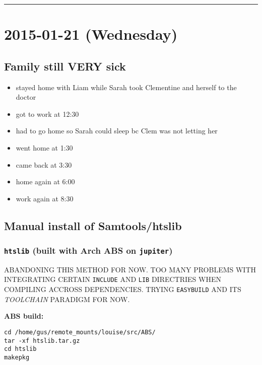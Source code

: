 \documentclass[letterpaper]{scrartcl}
\begin{document}
\begin{center}\rule{0.5\linewidth}{\linethickness}\end{center}

\section{2015-01-21 (Wednesday)}\label{wednesday-1}

\subsection{Family still VERY sick}\label{family-still-very-sick}

\begin{itemize}
\itemsep1pt\parskip0pt
\item
  stayed home with Liam while Sarah took Clementine and herself to the
  doctor
\item
  got to work at 12:30
\item
  had to go home so Sarah could sleep bc Clem was not letting her
\item
  went home at 1:30
\item
  came back at 3:30
\item
  home again at 6:00
\item
  work again at 8:30
\end{itemize}

\subsection{Manual install of
Samtools/htslib}\label{manual-install-of-samtoolshtslib}

\subsubsection{\texttt{htslib} (built with Arch ABS on
\texttt{jupiter})}\label{htslib-built-with-arch-abs-on-jupiter}

ABANDONING THIS METHOD FOR NOW. TOO MANY PROBLEMS WITH INTEGRATING
CERTAIN \texttt{INCLUDE} AND \texttt{LIB} DIRECTRIES WHEN COMPILING
ACCROSS DEPENDENCIES. TRYING \texttt{EASYBUILD} AND ITS \emph{TOOLCHAIN}
PARADIGM FOR NOW.

\textbf{ABS build:}

\begin{verbatim}
cd /home/gus/remote_mounts/louise/src/ABS/
tar -xf htslib.tar.gz
cd htslib
makepkg
\end{verbatim}
\end{document}
